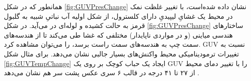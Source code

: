 همانطور که در شکل 
\ref{fig:GUVPresChange}
نشان داده‌ شده‌است، با تغییر غلظت نمک در محیط یک غشایِ لیپیدیِ دارای کلسترول، از شکل اولیه آب نباتیِ  
شبیه‌ به گلبول قرمز به حالت کشیده و لوله‌ای در می‌آید. در شکل 
\ref{fig:GUVPresChange}
ساختار‌های هندسی میاینی (و در مواردی ناپایدار) مختلفی که غشا طی می‌کند تا از هندسه‌های سمت چپ به هندسه‌های سمت راست برسد، را می‌توان مشاهده کرد.
GUV نسبت به تغییرات ترمودینامیکی محیط واکنش‌های بسیار جالبی نشان می‌دهد. برای مثال شکل
\ref{fig:GUVTempChange}
ایجاد یک حباب کوچک بر روی یک GUV را با تغییر دمای محیط از ۲۷ تا ۴۱ درجه در قالب ۶ سری عکس پشت سر هم نشان می‌دهد
\cite{MemReviewRamakrishnan2014}.



 

 
 
 
 
 
 
 
 
 
 
 
 